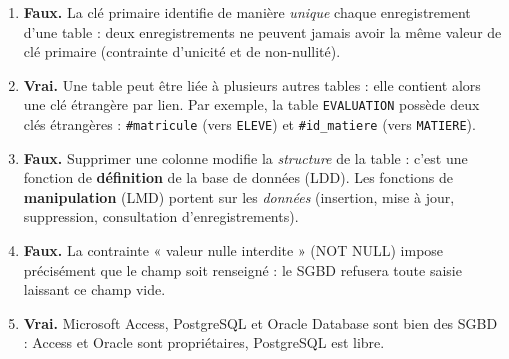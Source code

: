 \documentclass[11pt]{article}
\newcommand{\cle}[1]{{\popxbold\color{popdark}#1}}
\begin{document}
\begin{corrige}
\begin{enumerate}
\item \textbf{Faux.} La \cle{clé primaire} identifie de manière \emph{unique} chaque enregistrement d'une table : deux enregistrements ne peuvent jamais avoir la même valeur de clé primaire (contrainte d'unicité et de non-nullité).
\item \textbf{Vrai.} Une table peut être liée à plusieurs autres tables : elle contient alors une \cle{clé étrangère} par lien. Par exemple, la table \texttt{EVALUATION} possède deux clés étrangères : \texttt{\#matricule} (vers \texttt{ELEVE}) et \texttt{\#id\_matiere} (vers \texttt{MATIERE}).
\item \textbf{Faux.} Supprimer une colonne modifie la \emph{structure} de la table : c'est une fonction de \textbf{définition} de la base de données (LDD). Les fonctions de \textbf{manipulation} (LMD) portent sur les \emph{données} (insertion, mise à jour, suppression, consultation d'enregistrements).
\item \textbf{Faux.} La contrainte « \cle{valeur nulle interdite} » (NOT NULL) impose précisément que le champ soit renseigné : le SGBD refusera toute saisie laissant ce champ vide.
\item \textbf{Vrai.} Microsoft Access, PostgreSQL et Oracle Database sont bien des \cle{SGBD} : Access et Oracle sont propriétaires, PostgreSQL est libre.
\end{enumerate}
\end{corrige}
\end{document}
